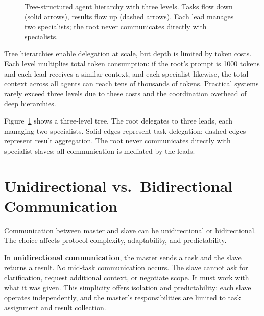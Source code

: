\begin{figure}[t]
\caption{Tree-structured agent hierarchy with three levels. Tasks flow down (solid arrows), results flow up (dashed arrows). Each lead manages two specialists; the root never communicates directly with specialists.}
\label{fig:tree_hierarchy}
\end{figure}

Tree hierarchies enable delegation at scale, but depth is limited by token costs. Each level multiplies total token consumption: if the root's prompt is 1000 tokens and each lead receives a similar context, and each specialist likewise, the total context across all agents can reach tens of thousands of tokens. Practical systems rarely exceed three levels due to these costs and the coordination overhead of deep hierarchies.

Figure~\ref{fig:tree_hierarchy} shows a three-level tree. The root delegates to three leads, each managing two specialists. Solid edges represent task delegation; dashed edges represent result aggregation. The root never communicates directly with specialist slaves; all communication is mediated by the leads.

\section{Unidirectional vs.\ Bidirectional Communication}\label{sec:uni_bi}

Communication between master and slave can be unidirectional or bidirectional. The choice affects protocol complexity, adaptability, and predictability.

In \textbf{unidirectional communication}, the master sends a task and the slave returns a result. No mid-task communication occurs. The slave cannot ask for clarification, request additional context, or negotiate scope. It must work with what it was given. This simplicity offers isolation and predictability: each slave operates independently, and the master's responsibilities are limited to task assignment and result collection.

